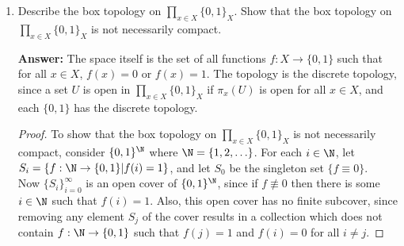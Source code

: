 \documentclass[letterpaper]{article}
\begin{document}
\begin{enumerate}
\begin{enumerate}
\begin{proof}[\textbf{Proof ($\impliedby$)}]
	so $g(p)\in U$. Thus, $\bigcap V_{\alpha_i} \subset g^{-1}(U)$. Now we show that $\bigcap V_{\alpha_i} \supset g^{-1}(U)$. Let $p\in\preimage{g}{U}$. So $g(p)\in U$, and 
	\[(\pi_{\alpha} \circ g)(p) \in 
	\begin{cases}
	U_\alpha & \alpha\in \{\alpha_1, \ldots, \alpha_N\}\\
	X_\alpha & \alpha\not\in \{\alpha_1, \ldots, \alpha_N\}\\
	\end{cases}
	\]
	thus, $p\in\bigcap V_{\alpha_i}$ by definition of $V_{\alpha_i}$. Thus, we have shown that for every basic open set $U$, $\preimage{g}{U}$ is open, therefore $g$ is continuous. 
	\end{proof}
	\end{enumerate}

\item Describe the box topology on $\prod\limits_{x\in X}\{0,1\}_X$. Show that the box topology on $\prod\limits_{x\in X}\{0,1\}_X$ is not necessarily compact. 

\textbf{Answer:} The space itself is the set of all functions $f:X\to\{0,1\}$ such that for all $x\in X$, $f(x)=0$ or $f(x)=1$. The topology is the discrete topology, since a set $U$ is open in $\prod\limits_{x\in X}\{0,1\}_X$ if $\pi_x(U)$ is open for all $x\in X$, and each $\{0,1\}$ has the discrete topology. 

\begin{proof}
To show that the box topology on $\prod\limits_{x\in X}\{0,1\}_X$ is not necessarily compact, consider $\{0,1\}^\N$ where $\N=\{1, 2, \ldots\}$. For each $i\in\N$, let $S_i = \{f:\N\to \{0,1\} | f(i)=1\}$, and let $S_{0}$ be the singleton set $\{f\equiv 0\}$. \\
Now $\{S_i\}_{i=0}^{\infty}$ is an open cover of $\{0,1\}^\N$, since if $f\not\equiv0$ then there is some $i\in\N$ such that $f(i)=1$. Also, this open cover has no finite subcover, since removing any element $S_j$ of the cover results in a collection which does not contain $f:\N\to \{0,1\}$ such that $f(j)=1$ and $f(i)=0$ for all $i\neq j$. 
\end{proof}



\end{enumerate}
\end{document}
